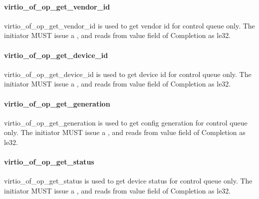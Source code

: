 \paragraph{virtio_of_op_get_vendor_id}\label{sec:Virtio Transport Options / Virtio Over Fabrics / Transmission Protocol / Opcodes Definition / virtio_of_op_get_vendor_id}

virtio_of_op_get_vendor_id is used to get vendor id for control queue only.
The initiator MUST issue a ,
and reads from value field of Completion as le32.

\paragraph{virtio_of_op_get_device_id}\label{sec:Virtio Transport Options / Virtio Over Fabrics / Transmission Protocol / Opcodes Definition / virtio_of_op_get_device_id}

virtio_of_op_get_device_id is used to get device id for control queue only.
The initiator MUST issue a ,
and reads from value field of Completion as le32.

\paragraph{virtio_of_op_get_generation}\label{sec:Virtio Transport Options / Virtio Over Fabrics / Transmission Protocol / Opcodes Definition / virtio_of_op_get_generation}

virtio_of_op_get_generation is used to get config generation for control queue only.
The initiator MUST issue a ,
and reads from value field of Completion as le32.

\paragraph{virtio_of_op_get_status}\label{sec:Virtio Transport Options / Virtio Over Fabrics / Transmission Protocol / Opcodes Definition / virtio_of_op_get_status}

virtio_of_op_get_status is used to get device status for control queue only.
The initiator MUST issue a ,
and reads from value field of Completion as le32.

